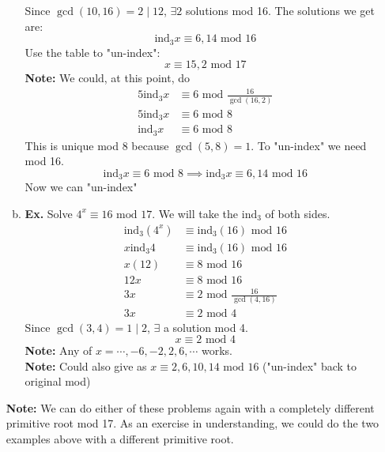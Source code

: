 \documentclass[class=article, crop=false]{standalone}
\def\ind{{\text{ind}}}
\begin{document}
\begin{enumerate}[1.]
\begin{enumerate}[(a)]
	Since $\gcd(10,16) = 2\mid 12$, $\exists 2$ solutions mod 16. The solutions we get are:
	$$\ind_3 x \equiv 6, 14 \mbox{ mod } 16$$
	Use the table to "un-index":
	$$x \equiv 15, 2 \mbox{ mod } 17$$
	{\color{red}\text{*}}\textbf{Note:} We could, at this point, do
	\begin{align*}
		5\ind_3 x &\equiv 6\mbox{ mod }\frac{16}{\gcd(16, 2)} \\
		5\ind_3 x &\equiv 6\mbox{ mod } 8 \\
		\ind_3 x &\equiv 6\mbox{ mod } 8
	\end{align*}
	This is unique mod 8 because $\gcd(5,8)=1$. To "un-index" we need mod 16.
	$$\ind_3 x \equiv 6\mbox{ mod } 8 \implies \ind_3 x \equiv 6, 14\mbox{ mod } 16$$
	Now we can "un-index"

	\item \textbf{Ex.} Solve $4^x \equiv 16\mbox{ mod } 17$. We will take the $\ind_3$ of both sides.
	\begin{align*}
		\ind_3 (4^x) &\equiv \ind_3 (16) \mbox{ mod } 16 \\
		x\ind_3 4 &\equiv \ind_3 (16) \mbox{ mod } 16 \\
		x(12) &\equiv 8 \mbox{ mod } 16 \\
		12x &\equiv 8 \mbox{ mod } 16 \\
		3x &\equiv 2\mbox{ mod } \frac{16}{\gcd(4, 16)} \\
		3x &\equiv 2\mbox{ mod } 4
	\end{align*}
	Since $\gcd(3,4)=1\mid 2$, $\exists$ a solution mod 4.
	$$x \equiv 2\mbox{ mod } 4$$
	\textbf{Note:} Any of $x= \cdots, -6, -2, 2, 6, \cdots$ works. \\
	\textbf{Note:} Could also give as $x \equiv 2, 6, 10, 14 \mbox{ mod } 16$ ("un-index" back to original mod)
\end{enumerate}
\textbf{Note:} We can do either of these problems again with a completely different primitive root mod 17.
As an exercise in understanding, we could do the two examples above with a different primitive root.
\end{enumerate}
\end{document}
